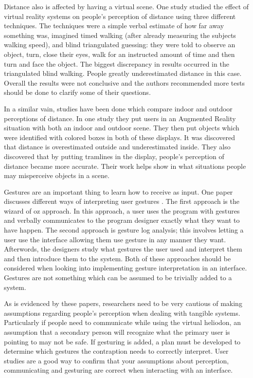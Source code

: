 Distance also is affected by having a virtual scene. One study \cite{4811007} studied the effect of virtual reality systems on people's perception of distance using three different techniques.  The techniques were a simple verbal estimate of how far away something was, imagined timed walking (after already measuring the subjects walking speed), and blind triangulated guessing: they were told to observe an object, turn, close their eyes, walk for an instructed amount of time and then turn and face the object.  The biggest discrepancy in results occurred in the triangulated blind walking.  People greatly underestimated distance in this case.  Overall the results were not conclusive and the authors recommended more tests should be done to clarify some of their questions. 

In a similar vain, studies have been done which compare indoor and outdoor perceptions of distance.  In one study \cite{1549848} they put users in an Augmented Reality situation with both an indoor and outdoor scene.  They then put objects which were identified with colored boxes in both of these displays. It was discovered that distance is overestimated outside and underestimated inside.  They also discovered that by putting tramlines in the display, people's perception of distance became more accurate. Their work helps show in what situations people may misperceive objects in a scene.

Gestures are an important thing to learn how to receive as input.  One paper discusses different ways of interpreting user gestures \cite{1240868}.  The first approach is the wizard of oz approach.  In this approach, a user uses the program with gestures and verbally communicates to the program designer exactly what they want to have happen.  The second approach is gesture log analysis; this involves letting a user use the interface allowing them use gesture in any manner they want.  Afterwords, the designers study what gestures the user used and interpret them and then introduce them to the system. Both of these approaches should be considered when looking into implementing gesture interpretation in an interface.  Gestures are not something which can be assumed to be trivially added to a system.

As is evidenced by these papers, researchers need to be very cautious of making assumptions regarding people's perception when dealing with tangible systems.  Particularly if people need to communicate while using the virtual heliodon, an assumption that a secondary person will recognize what the primary user is pointing to may not be safe.  If gesturing is added, a plan must be developed to determine which gestures the contraption needs to correctly interpret.  User studies are a good way to confirm that your assumptions about perception, communicating and gesturing are correct when interacting with an interface.

